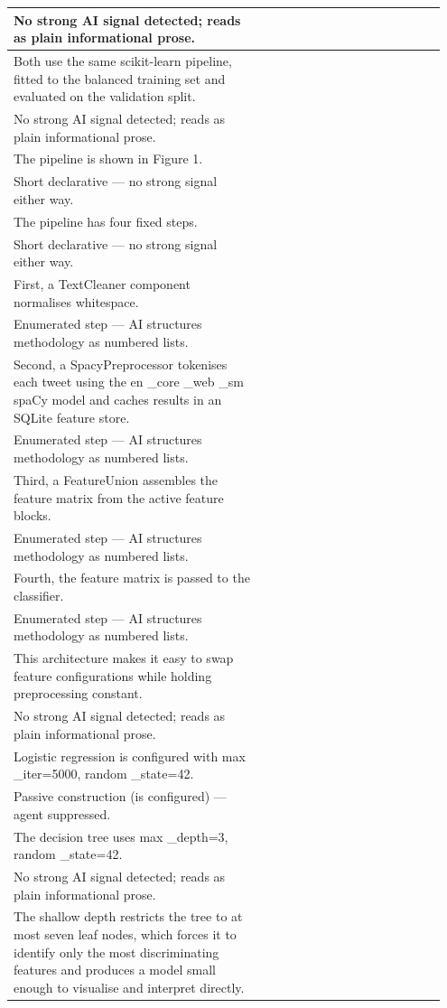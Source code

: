 \documentclass[11pt]{article}
\begin{document}
\begin{longtable}{|p{0.55\linewidth}|p{0.40\linewidth}|}
\hline
No strong AI signal detected; reads as plain informational prose. & \\
\hline
Both use the same scikit-learn pipeline, fitted to the balanced training set and evaluated on the validation split. & \\[2pt]
\hline
No strong AI signal detected; reads as plain informational prose. & \\
\hline
The pipeline is shown in Figure 1. & \\[2pt]
\hline
Short declarative --- no strong signal either way. & \\
\hline
The pipeline has four fixed steps. & \\[2pt]
\hline
Short declarative --- no strong signal either way. & \\
\hline
First, a TextCleaner component normalises whitespace. & \\[2pt]
\hline
Enumerated step --- AI structures methodology as numbered lists. & \\
\hline
Second, a SpacyPreprocessor tokenises each tweet using the en \_core \_web \_sm spaCy model and caches results in an SQLite feature store. & \\[2pt]
\hline
Enumerated step --- AI structures methodology as numbered lists. & \\
\hline
Third, a FeatureUnion assembles the feature matrix from the active feature blocks. & \\[2pt]
\hline
Enumerated step --- AI structures methodology as numbered lists. & \\
\hline
Fourth, the feature matrix is passed to the classifier. & \\[2pt]
\hline
Enumerated step --- AI structures methodology as numbered lists. & \\
\hline
This architecture makes it easy to swap feature configurations while holding preprocessing constant. & \\[2pt]
\hline
No strong AI signal detected; reads as plain informational prose. & \\
\hline
Logistic regression is configured with max \_iter=5000, random \_state=42. & \\[2pt]
\hline
Passive construction (is configured) --- agent suppressed. & \\
\hline
The decision tree uses max \_depth=3, random \_state=42. & \\[2pt]
\hline
No strong AI signal detected; reads as plain informational prose. & \\
\hline
The shallow depth restricts the tree to at most seven leaf nodes, which forces it to identify only the most discriminating features and produces a model small enough to visualise and interpret directly. & \\[2pt]

\end{longtable}
\end{document}
